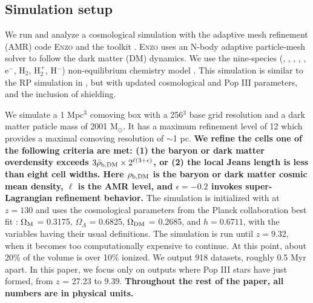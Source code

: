 \documentclass[fleqn,usenatbib]{mnras}
\begin{document}
\subsection{Simulation setup}
We run and analyze a cosmological simulation with the adaptive mesh refinement (AMR) code \textsc{Enzo} \citep{Enzo} and the toolkit \yt{} \citep{yt_full_paper}. \textsc{Enzo} uses an N-body adaptive particle-mesh solver \citep{Efstathiou85, Couchman91} to follow the dark matter (DM) dynamics. We use the nine-species (\hi, \hii, \hei, \heii, \heiii, e$^{-}$, H$_{2}$, H$_{2}^{+}$, H$^{-}$) non-equilibrium chemistry model \citep{Abel97, Anninos97}. This simulation is similar to the RP simulation in \citet[hereafter W12]{Wise12_RP}, but with updated cosmological and Pop III parameters, and the inclusion of \hh{} shielding.

We simulate a 1 Mpc$^{3}$ comoving box with a 256$^{3}$ base grid 
resolution and a dark matter paticle mass of 2001 M$_{\odot}$. It has a maximum refinement level of 12 which provides a maximal comoving resolution of $\sim$1 pc.  \textbf{We refine the cells one of the following criteria are met: (1) the baryon or dark matter overdensity exceeds $3\bar{\rho}_{\rm b,DM} \times 2^{\ell(3+\epsilon)}$, or (2) the local Jeans length is less than eight cell widths.  Here $\rho_{\rm b,DM}$ is the baryon or dark matter cosmic mean density, $\ell$ is the AMR level, and $\epsilon = -0.2$ invokes super-Lagrangian refinement behavior.} The simulation is initialized with \music{} \citep{Hahn11_MUSIC} at $z = 130$ and uses the cosmological parameters from the Planck collaboration best fit \citet{Planck13_Cosmo}: $\Omega_{\rm M}$ = 0.3175, $\Omega_{\Lambda}$ = 0.6825, $\Omega_{\rm DM}$ = 0.2685, and $h = 0.6711$, with the variables having their usual definitions. The simulation is run until $z = 9.32$, when it becomes too computationally expensive to continue. At this point, about 20\% of the volume is over 10\% ionized. We output 918 datasets,  roughly 0.5 Myr apart. In this paper, we focus only on outputs where Pop III stars have just formed, from $z$ = 27.23 to 9.39. \textbf{Throughout the rest of the paper, all numbers are in physical units.}
\end{document}
